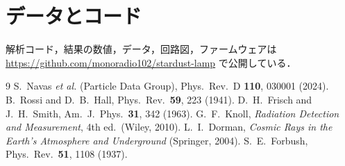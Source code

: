 \documentclass[a4paper,twocolumn,10pt]{ltjsarticle}
\begin{document}
\section*{データとコード}

解析コード，結果の数値，データ，回路図，ファームウェアは \url{https://github.com/monoradio102/stardust-lamp} で公開している．

\begin{thebibliography}{9}\small
{} S.~Navas \textit{et al.} (Particle Data Group), Phys.\ Rev.\ D \textbf{110}, 030001 (2024).
 B.~Rossi and D.~B.~Hall, Phys.\ Rev.\ \textbf{59}, 223 (1941).
 D.~H.~Frisch and J.~H.~Smith, Am.\ J.\ Phys.\ \textbf{31}, 342 (1963).
 G.~F.~Knoll, \textit{Radiation Detection and Measurement}, 4th ed.\ (Wiley, 2010).
 L.~I.~Dorman, \textit{Cosmic Rays in the Earth's Atmosphere and Underground} (Springer, 2004).
 S.~E.~Forbush, Phys.\ Rev.\ \textbf{51}, 1108 (1937).
\end{thebibliography}
\end{document}
